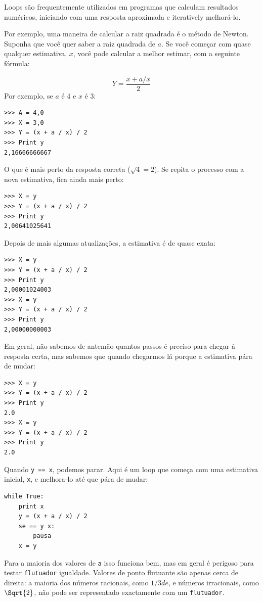 \documentclass[10pt]{book}
\begin{document}
\begin{exercise}
{Loops são frequentemente utilizados em programas que calculam
resultados numéricos, iniciando com uma resposta aproximada e
iteratively melhorá-lo.

Por exemplo, uma maneira de calcular a raiz quadrada é o método de Newton.
Suponha que você quer saber a raiz quadrada de $ a $. Se você começar
com quase qualquer estimativa, $ x $, você pode calcular a melhor
estimar, com a seguinte fórmula:

\[Y = \frac {x + a / x} {2} \]
%
Por exemplo, se $ a $ é 4 e $ x $ é 3:

\begin{verbatim}
>>> A = 4,0
>>> X = 3,0
>>> Y = (x + a / x) / 2
>>> Print y
2,16666666667
\end{verbatim}
%
O que é mais perto da resposta correta ($ \sqrt {4} = 2 $). Se
repita o processo com a nova estimativa, fica ainda mais perto:

\begin{verbatim}
>>> X = y
>>> Y = (x + a / x) / 2
>>> Print y
2,00641025641
\end{verbatim}
%
Depois de mais algumas atualizações, a estimativa é de quase exata:

\begin{verbatim}
>>> X = y
>>> Y = (x + a / x) / 2
>>> Print y
2,00001024003
>>> X = y
>>> Y = (x + a / x) / 2
>>> Print y
2,00000000003
\end{verbatim}
%
Em geral, não sabemos de antemão quantos passos é preciso
para chegar à resposta certa, mas sabemos que quando chegarmos lá
porque a estimativa
pára de mudar:

\begin{verbatim}
>>> X = y
>>> Y = (x + a / x) / 2
>>> Print y
2.0
>>> X = y
>>> Y = (x + a / x) / 2
>>> Print y
2.0
\end{verbatim}
%
Quando {\tt y == x}, podemos parar. Aqui é um loop que começa
com uma estimativa inicial, {\tt x}, e melhora-lo até que
pára de mudar:

\begin{verbatim}
while True:
    print x
    y = (x + a / x) / 2
    se == y x:
        pausa
    x = y
\end{verbatim}
%
Para a maioria dos valores de {\tt a} isso funciona bem, mas em geral é
perigoso para testar {\tt flutuador} igualdade.
Valores de ponto flutuante são apenas cerca de direita:
a maioria dos números racionais, como $ 1/3 de $, e números irracionais, como
$ \Sqrt {2} $, não pode ser representado exactamente com um {\tt flutuador}.

}
\end{exercise}
\end{document}

